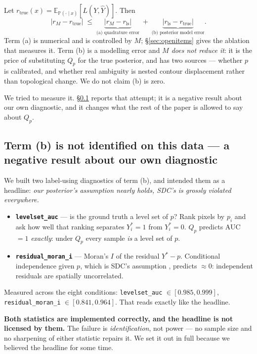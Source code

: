 \documentclass[11pt]{article}
\theoremstyle{remark}
\newcommand{\Yhat}{\widehat{Y}}
\newcommand{\Ex}{\mathbb{E}}
\newcommand{\Prb}{\mathbb{P}}
\begin{document}
Let $r_{\mathrm{true}}(x) = \Ex_{\Prb(\cdot\mid x)}[L(Y,\Yhat)]$. Then
\begin{equation}\label{eq:decomp}
| r_M - r_{\mathrm{true}} |
\;\le\;
\underbrace{| r_M - r_{\mathrm{ls}} |}_{\text{(a) quadrature error}}
\;+\;
\underbrace{| r_{\mathrm{ls}} - r_{\mathrm{true}} |}_{\text{(b) posterior model error}} .
\end{equation}
Term (a) is numerical and is controlled by $M$; \S\ref{sec:openitems} gives the
ablation that measures it. Term (b) is a modelling error and \emph{$M$ does not
reduce it}: it is the price of substituting $Q_p$ for the true posterior, and has
two sources --- whether $p$ is calibrated, and whether real ambiguity is nested
contour displacement rather than topological change. We do not claim (b) is zero.

We tried to measure it. \S\ref{sec:termb} reports that attempt; it is a negative result
about our own diagnostic, and it changes what the rest of the paper is allowed to say
about $Q_p$.

\subsection{Term (b) is not identified on this data --- a negative result about our own
diagnostic}\label{sec:termb}

We built two label-using diagnostics of term (b), and intended them as a headline:
\emph{our posterior's assumption nearly holds, SDC's is grossly violated everywhere.}
\begin{itemize}
\item \textbf{\texttt{levelset\_auc}} --- is the ground truth a level set of $p$? Rank
pixels by $p_i$ and ask how well that ranking separates $Y^*_i=1$ from $Y^*_i=0$. $Q_p$
predicts AUC $=1$ \emph{exactly}: under $Q_p$ every sample \emph{is} a level set of $p$.
\item \textbf{\texttt{residual\_moran\_i}} --- Moran's $I$ of the residual $Y^*-p$.
Conditional independence given $p$, which is SDC's assumption \cite[eq.~30]{sdc},
predicts $\approx 0$: independent residuals are spatially uncorrelated.
\end{itemize}
Measured across the eight conditions: \texttt{levelset\_auc} $\in[0.985, 0.999]$,
\texttt{residual\_moran\_i} $\in[0.841, 0.964]$. That reads exactly like the headline.

\textbf{Both statistics are implemented correctly, and the headline is not licensed by
them.} The failure is \emph{identification}, not power --- no sample size and no
sharpening of either statistic repairs it. We set it out in full because we believed the
headline for some time.
\end{document}
